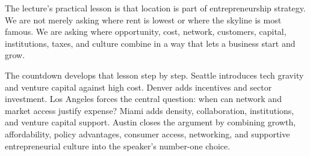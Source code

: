 The lecture's practical lesson is that location is part of entrepreneurship strategy. We are not merely asking where rent is lowest or where the skyline is most famous. We are asking where opportunity, cost, network, customers, capital, institutions, taxes, and culture combine in a way that lets a business start and grow.

The countdown develops that lesson step by step. Seattle introduces tech gravity and venture capital against high cost. Denver adds incentives and sector investment. Los Angeles forces the central question: when can network and market access justify expense? Miami adds density, collaboration, institutions, and venture capital support. Austin closes the argument by combining growth, affordability, policy advantages, consumer access, networking, and supportive entrepreneurial culture into the speaker's number-one choice.
